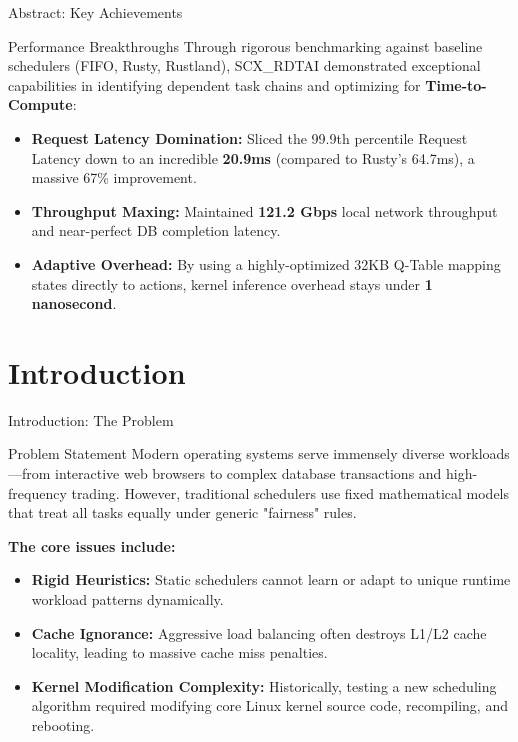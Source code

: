 \documentclass[aspectratio=169]{beamer}
\begin{document}
\begin{frame}{Abstract: Key Achievements}
    \begin{alertblock}{Performance Breakthroughs}
        Through rigorous benchmarking against baseline schedulers (FIFO, Rusty, Rustland), SCX\_RDTAI demonstrated exceptional capabilities in identifying dependent task chains and optimizing for \textbf{Time-to-Compute}:
    \end{alertblock}
    
    \vspace{0.3cm}
    \begin{itemize}
        \item \textbf{Request Latency Domination:} Sliced the 99.9th percentile Request Latency down to an incredible \textbf{20.9ms} (compared to Rusty's 64.7ms), a massive 67\% improvement.
        \item \textbf{Throughput Maxing:} Maintained \textbf{121.2 Gbps} local network throughput and near-perfect DB completion latency.
        \item \textbf{Adaptive Overhead:} By using a highly-optimized 32KB Q-Table mapping states directly to actions, kernel inference overhead stays under \textbf{1 nanosecond}.
    \end{itemize}
\end{frame}

\section{Introduction}

\begin{frame}{Introduction: The Problem}
    \begin{alertblock}{Problem Statement}
        Modern operating systems serve immensely diverse workloads—from interactive web browsers to complex database transactions and high-frequency trading. However, traditional schedulers use fixed mathematical models that treat all tasks equally under generic "fairness" rules.
    \end{alertblock}
    
    \vspace{0.3cm}
    \textbf{The core issues include:}
    \begin{itemize}
        \item \textbf{Rigid Heuristics:} Static schedulers cannot learn or adapt to unique runtime workload patterns dynamically.
        \item \textbf{Cache Ignorance:} Aggressive load balancing often destroys L1/L2 cache locality, leading to massive cache miss penalties.
        \item \textbf{Kernel Modification Complexity:} Historically, testing a new scheduling algorithm required modifying core Linux kernel source code, recompiling, and rebooting.
    \end{itemize}
\end{frame}
\end{document}
